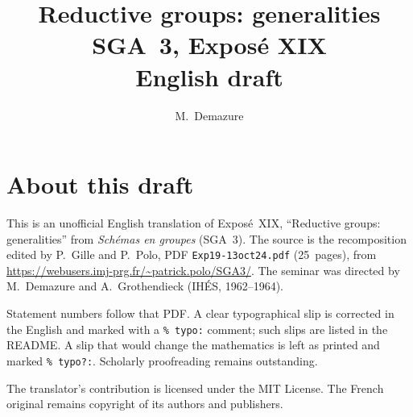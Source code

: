 \documentclass[11pt,a4paper,oneside]{amsbook}
\title[SGA~3, Expos\'e XIX (English draft)]{Reductive groups: generalities\\
{\normalsize SGA~3, Expos\'e XIX\\English draft}}
\author{M.\ Demazure}
\date{}
\begin{document}
\frontmatter
\maketitle

\chapter*{About this draft}
This is an unofficial English translation of Expos\'e~XIX, ``Reductive groups: generalities''
from \textit{Sch\'emas en groupes} (SGA~3).
The source is the recomposition edited by P.~Gille and P.~Polo,
PDF \texttt{Exp19-13oct24.pdf} (25~pages),
from \url{https://webusers.imj-prg.fr/~patrick.polo/SGA3/}.
The seminar was directed by M.~Demazure and A.~Grothendieck
(IH\'ES, 1962--1964).

Statement numbers follow that PDF. A clear typographical slip is
corrected in the English and marked with a \texttt{\% typo:} comment;
such slips are listed in the README. A slip that would change the
mathematics is left as printed and marked \texttt{\% typo?:}.
Scholarly proofreading remains outstanding.

The translator's contribution is licensed under the MIT License.
The French original remains copyright of its authors and publishers.

\tableofcontents
\mainmatter




\end{document}

